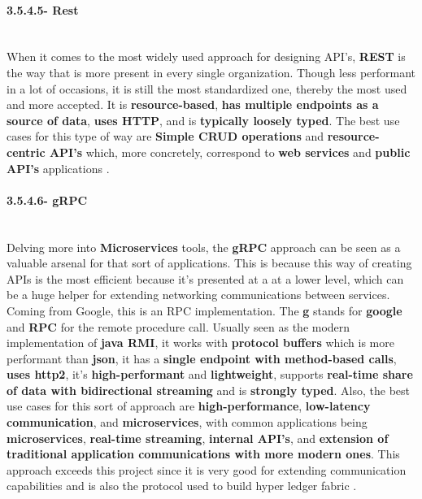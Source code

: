 \paragraph{3.5.4.5- Rest}\mbox{}\\
When it comes to the most widely used approach for designing API's, \textbf{REST} is the way that is more present in every single organization. Though less performant in a lot of occasions, it is still the most standardized one, thereby the most used and more accepted. It is \textbf{resource-based}, \textbf{has multiple endpoints as a source of data}, \textbf{uses HTTP}, and is \textbf{typically loosely typed}. The best use cases for this type of way are \textbf{Simple CRUD operations} and \textbf{resource-centric API's} which, more concretely, correspond to \textbf{web services} and \textbf{public API's} applications \cite{rest}.


\paragraph{3.5.4.6- gRPC}\mbox{}\\
Delving more into \textbf{Microservices} tools, the \textbf{gRPC} approach can be seen as a valuable arsenal for that sort of applications. This is because this way of creating APIs is the most efficient because it's presented at a at a lower level, which can be a huge helper for extending networking communications between services. Coming from Google, this is an RPC implementation. The \textbf{g} stands for \textbf{google} and \textbf{RPC} for the remote procedure call. Usually seen as the modern implementation of \textbf{java RMI}, it works with \textbf{protocol buffers} which is more performant than \textbf{json}, it has a \textbf{single endpoint with method-based calls}, \textbf{uses http2}, it's \textbf{high-performant} and \textbf{lightweight}, supports \textbf{real-time share of data with bidirectional streaming} and is \textbf{strongly typed}. Also, the best use cases for this sort of approach are \textbf{high-performance}, \textbf{low-latency communication}, and \textbf{microservices}, with common applications being \textbf{microservices}, \textbf{real-time streaming}, \textbf{internal API's}, and \textbf{extension of traditional application communications with more modern ones}.
This approach exceeds this project since it is very good for extending communication capabilities and is also the protocol used to build hyper ledger fabric \cite{grpc}\cite{grpc2}.

